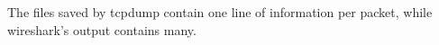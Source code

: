 The files saved by tcpdump contain one line of information per packet, 
while wireshark's output contains many.